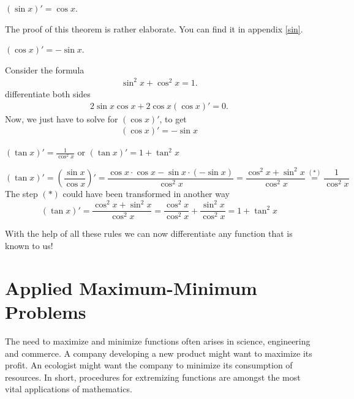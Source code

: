 \documentclass[12pt,eng]{skript_ogg}
\begin{document}
\newpage

\begin{satz}
$(\sin x )'=\cos x$.
\end{satz}
The proof of this theorem is rather elaborate. You can find it in appendix \ref{sin}. 

\begin{satz}
$(\cos x)'=-\sin x$.
\end{satz}
\begin{beweis}
Consider the formula
\begin{align*}
\sin^2 x+\cos^2 x=1. 
\end{align*}
differentiate both sides
\begin{align*}
2\sin x \cos x+2\cos x(\cos x)'=0.
\end{align*}
Now, we just have to solve for $(\cos x)'$, to get
\begin{align*}
(\cos x)'=-\sin x
\end{align*}
\end{beweis}

\begin{satz}$(\tan x)'=\frac{1}{\cos^2x}$ or $(\tan x)'=1+\tan^2x$
\end{satz}
\begin{beweis}
\[(\tan x)'=\left(\frac{\sin x}{\cos x}\right)'=\frac{\cos x\cdot\cos x-\sin x\cdot(-\sin x)}{\cos^2x}=\frac{\cos^2x+\sin^2x}{\cos^2x}\stackrel{(*)}{=}\frac{1}{\cos^2x}\]
The step $(*)$ could have been transformed in another way
\[(\tan x)'=\frac{\cos^2x+\sin^2x}{\cos^2x}=\frac{\cos^2x}{\cos^2x}+\frac{\sin^2x}{\cos^2x}=1+\tan^2x\]
\end{beweis}

With the help of all these rules we can now differentiate any function that is known to us!

\newpage

\section{Applied Maximum-Minimum Problems}
The need to maximize and minimize functions often arises in science, engineering and commerce. A company developing a new product might want to maximize its profit. An ecologist might want the company to minimize its consumption of resources. In short, procedures for extremizing functions are amongst the most vital applications of mathematics.
\end{document}
